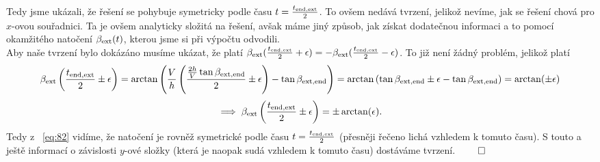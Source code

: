 \documentclass[reqno, a4paper]{amsart}
\begin{document}
Tedy jsme ukázali, že řešení se pohybuje symetricky podle času $t=\frac{ t_{\mathrm{end}, \mathrm{ext}}}{2}$. To ovšem nedává tvrzení, jelikož nevíme, jak se řešení chová pro $x$-ovou souřadnici. Ta je ovšem analyticky složitá na řešení, avšak máme jiný způsob, jak získat dodatečnou informaci a to pomocí okamžitého natočení $\beta_{\mathrm{ext}}(t)$, kterou jsme si při výpočtu odvodili.\\
Aby naše tvrzení bylo dokázáno musíme ukázat, že platí $\beta_{\mathrm{ext}}(\frac{ t_{\mathrm{end}, \mathrm{ext}}}{2}+\epsilon)=-\beta_{\mathrm{ext}}(\frac{ t_{\mathrm{end}, \mathrm{ext}}}{2}-\epsilon)$. To již není žádný problém, jelikož platí
\begin{equation*}
	\beta_{\mathrm{ext}}\left( \frac{ t_{\mathrm{end}, \mathrm{ext}}}{2}\pm\epsilon\right) =\arctan\left( \frac{V}{h}\left( \frac{ \frac{2h}{V}\tan\beta_{\mathrm{ext}, \mathrm{end}}}{2}\pm\epsilon\right) - \tan \beta_{\mathrm{ext}, \mathrm{end}}\right) 
	= \arctan\left( \tan \beta_{\mathrm{ext}, \mathrm{end}}\pm\epsilon - \tan \beta_{\mathrm{ext}, \mathrm{end}}\right)
	=\arctan(\pm\epsilon)
\end{equation*}
\begin{equation}
	\label{eq:82}
	\implies \beta_{\mathrm{ext}}\left( \frac{ t_{\mathrm{end}, \mathrm{ext}}}{2}\pm\epsilon\right) =\pm\arctan(\epsilon).
\end{equation}
Tedy z ~\eqref{eq:82} vidíme, že natočení je rovněž symetrické podle času $t=\frac{ t_{\mathrm{end}, \mathrm{ext}}}{2}$ (přesněji řečeno lichá vzhledem k tomuto času). S touto a ještě informací o závislosti $y$-ové složky (která je naopak sudá vzhledem k tomuto času) dostáváme tvrzení. $\qed$
\end{document}
